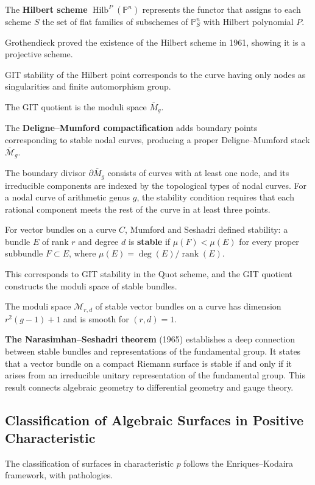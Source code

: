 The \textbf{Hilbert scheme} $\operatorname{Hilb}^P(\mathbb{P}^n)$ represents the functor that assigns to each scheme $S$ the set of flat families of subschemes of $\mathbb{P}^n_S$ with Hilbert polynomial $P$.

Grothendieck proved the existence of the Hilbert scheme in 1961, showing it is a projective scheme.

GIT stability of the Hilbert point corresponds to the curve having only nodes as singularities and finite automorphism group.

The GIT quotient is the moduli space $\overline{M}_g$.

The \textbf{Deligne--Mumford compactification} adds boundary points corresponding to stable nodal curves, producing a proper Deligne--Mumford stack $\overline{\mathcal{M}}_g$.

The boundary divisor $\partial \overline{M}_g$ consists of curves with at least one node, and its irreducible components are indexed by the topological types of nodal curves. For a nodal curve of arithmetic genus $g$, the stability condition requires that each rational component meets the rest of the curve in at least three points.

For vector bundles on a curve $C$, Mumford and Seshadri defined stability: a bundle $E$ of rank $r$ and degree $d$ is \textbf{stable} if $\mu(F) < \mu(E)$ for every proper subbundle $F \subset E$, where $\mu(E) = \deg(E)/\operatorname{rank}(E)$.

This corresponds to GIT stability in the Quot scheme, and the GIT quotient constructs the moduli space of stable bundles.

The moduli space $\mathcal{M}_{r,d}$ of stable vector bundles on a curve has dimension $r^2(g-1) + 1$ and is smooth for $(r,d) = 1$.

\textbf{The Narasimhan--Seshadri theorem} (1965) establishes a deep connection between stable bundles and representations of the fundamental group. It states that a vector bundle on a compact Riemann surface is stable if and only if it arises from an irreducible unitary representation of the fundamental group. This result connects algebraic geometry to differential geometry and gauge theory.

\subsection{Classification of Algebraic Surfaces in Positive Characteristic}

The classification of surfaces in characteristic $p$ follows the Enriques--Kodaira framework, with pathologies.

